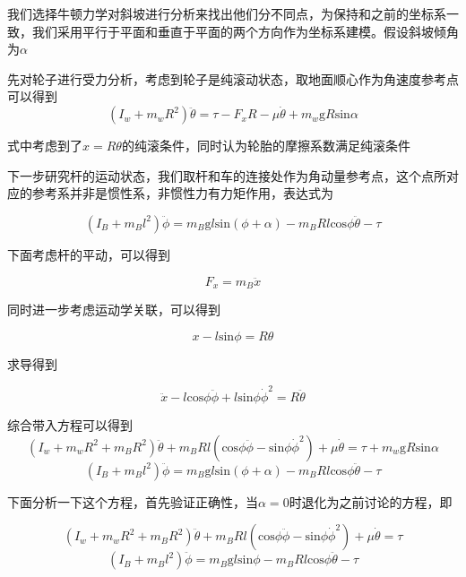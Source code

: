\documentclass[UTF8,a4paper]{paper}
\begin{document}
我们选择牛顿力学对斜坡进行分析来找出他们分不同点，为保持和之前的坐标系一致，我们采用平行于平面和垂直于平面的两个方向作为坐标系建模。假设斜坡倾角为$\alpha$

先对轮子进行受力分析，考虑到轮子是纯滚动状态，取地面顺心作为角速度参考点可以得到
\begin{equation}
(I_w+m_wR^2)\ddot{\theta}=\tau-F_xR-\mu\dot{\theta}+m_w\mathrm{g}R\mathrm{sin}\alpha
\end{equation}

式中考虑到了$x=R\theta$的纯滚条件，同时认为轮胎的摩擦系数满足纯滚条件

下一步研究杆的运动状态，我们取杆和车的连接处作为角动量参考点，这个点所对应的参考系并非是惯性系，非惯性力有力矩作用，表达式为

\begin{equation}
(I_B+m_Bl^2)\ddot{\phi}=m_B\mathrm{g}l\mathrm{sin}(\phi+\alpha)-m_BRl\mathrm{cos}\phi\ddot{\theta}-\tau
\end{equation}

下面考虑杆的平动，可以得到

\begin{equation}
F_x=m_B\ddot{x}
\end{equation}

同时进一步考虑运动学关联，可以得到

\begin{equation}
x-l\mathrm{sin}\phi=R\theta
\end{equation}

求导得到

\begin{equation}
\ddot{x}-l\mathrm{cos}\phi\ddot{\phi}+l\mathrm{sin}\phi\dot{\phi}^2=R\ddot{\theta}
\end{equation}

综合带入方程可以得到
\begin{equation}
(I_w+m_wR^2+m_BR^2)\ddot{\theta}+m_BRl(\mathrm{cos}\phi\ddot{\phi}-\mathrm{sin}\phi\dot{\phi}^2)+\mu\dot{\theta}=\tau+m_w\mathrm{g}R\mathrm{sin}\alpha
\end{equation}
\begin{equation}
(I_B+m_Bl^2)\ddot{\phi}=m_B\mathrm{g}l\mathrm{sin}(\phi+\alpha)-m_BRl\mathrm{cos}\phi\ddot{\theta}-\tau
\end{equation}

下面分析一下这个方程，首先验证正确性，当$\alpha=0$时退化为之前讨论的方程，即

\begin{equation}
(I_w+m_wR^2+m_BR^2)\ddot{\theta}+m_BRl(\mathrm{cos}\phi\ddot{\phi}-\mathrm{sin}\phi\dot{\phi}^2)+\mu\dot{\theta}=\tau
\end{equation}
\begin{equation}
(I_B+m_Bl^2)\ddot{\phi}=m_B\mathrm{g}l\mathrm{sin}\phi-m_BRl\mathrm{cos}\phi\ddot{\theta}-\tau
\end{equation}
\end{document}
